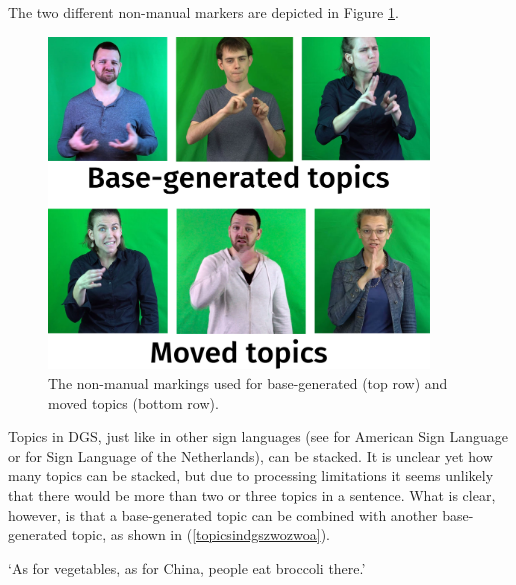 \noindent The two different non-manual markers are depicted in Figure \ref{topicsindgspicture}.

\begin{figure}[bt]
\centering
	\includegraphics[width=0.9\textwidth]{topicsdgs2.jpg}
	\caption{The non-manual markings used for base-generated (top row) and moved topics (bottom row).}
	\label{topicsindgspicture}
\end{figure}

Topics in DGS, just like in other sign languages (see \citealt{aarons1994aspects} for American Sign Language or \citealt{pfau2008topics} for Sign Language of the Netherlands), can be stacked. It is unclear yet how many topics can be stacked, but due to processing limitations it seems unlikely that there would be more than two or three topics in a sentence. What is clear, however, is that a base-generated topic can be combined with another base-generated topic, as shown in (\ref{topicsindgszwozwoa}).

\begin{exe}
\ex {}  
\glt `As for vegetables, as for China, people eat broccoli there.' \label{topicsindgszwozwoa} 
\end{exe}

